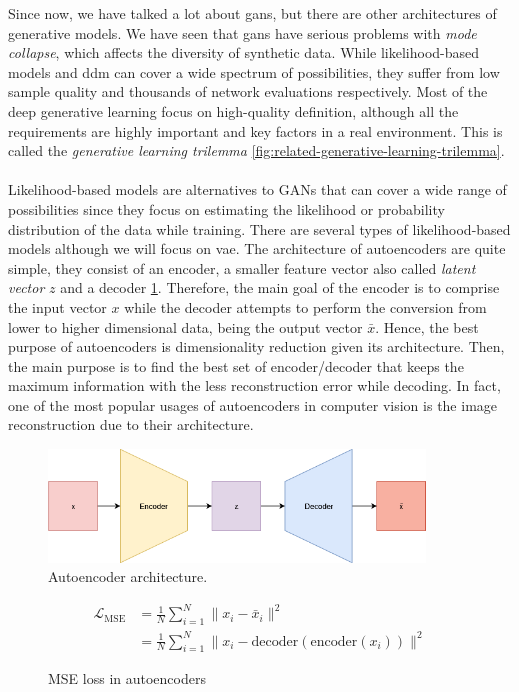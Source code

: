 \documentclass[11pt, a4paper]{article}
\begin{document}
	Since now, we have talked a lot about \gls{gan}s, but there are other architectures of generative models. We have seen that \gls{gan}s have serious problems with \textit{mode collapse}, which affects the diversity of synthetic data. While likelihood-based models and \gls{ddm} can cover a wide spectrum of possibilities, they suffer from low sample quality and thousands of network evaluations respectively. Most of the deep generative learning focus on high-quality definition, although all the requirements are highly important and key factors in a real environment. This is called the \textit{generative learning trilemma} \ref{fig:related-generative-learning-trilemma}.
	\\\\
	Likelihood-based models are alternatives to GANs that can cover a wide range of possibilities since they focus on estimating the likelihood or probability distribution of the data while training. There are several types of likelihood-based models although we will focus on \gls{vae}. The architecture of autoencoders are quite simple, they consist of an encoder, a smaller feature vector also called \textit{latent vector} $z$ and a decoder \ref{fig:related-autoencoder}. Therefore, the main goal of the encoder is to comprise the input vector $x$ while the decoder attempts to perform the conversion from lower to higher dimensional data, being the output vector $\bar{x}$. Hence, the best purpose of autoencoders is dimensionality reduction given its architecture. Then, the main purpose is to find the best set of encoder/decoder that keeps the maximum information with the less reconstruction error while decoding. In fact, one of the most popular usages of autoencoders in computer vision is the image reconstruction due to their architecture.
	\begin{figure}[H]
		\centering
		\includegraphics[width=10cm]{imgs/relatedwork/autoencoder}
		\caption{Autoencoder architecture.}
		\label{fig:related-autoencoder}
	\end{figure}
	\begin{figure}[H]
		\begin{align*}
			\mathcal{L}_{\text{MSE}} &= \frac{1}{N} \sum_{i=1}^{N} \| x_i - \bar{x}_i \|^2\\
				&= \frac{1}{N} \sum_{i=1}^{N} \| x_i - \text{decoder}(\text{encoder}(x_i)) \|^2
		\end{align*}
		\caption{MSE loss in autoencoders}
	\end{figure}
\end{document}

